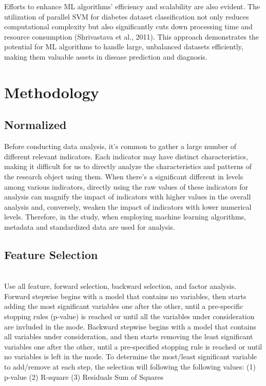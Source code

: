 \documentclass[11pt]{article}
\begin{document}
Efforts to enhance ML algorithms' efficiency and scalability are also evident. The utilization of parallel SVM for diabetes dataset classification not only reduces computational complexity but also significantly cuts down processing time and resource consumption (Shrivastava et al., 2011). This approach demonstrates the potential for ML algorithms to handle large, unbalanced datasets efficiently, making them valuable assets in disease prediction and diagnosis.

\section{Methodology}
\subsection{Normalized}
\text 
Before conducting data analysis, it's common to gather a large number of different relevant indicators. Each indicator may have distinct characteristics, making it difficult for us to directly analyze the characteristics and patterns of the research object using them. When there's a significant different in levels among various indicators, directly using the raw values of these indicators for analysis can magnify the impact of indicators with higher values in the overall analysis and, conversely, weaken the impact of indicators with lower numerical levels. Therefore, in the study, when employing machine learning algorithms, metadata and standardized data are used for analysis. 
\subsection{Feature Selection}\\
\text Use all feature, forward selection, backward selection, and factor analysis. Forward stepwise begins with a model that contains no variables, then starts adding the most significant variables one after the other, until a pre-specific stopping rules (p-value) is reached or until all the variables under consideration are invluded in the mode. Backward stepwise begins with a model that contains all variables under consideration, and then starts removing the least significant variables one after the other, until a pre-specified stopping rule is reached or until no variables is left in the mode. To determine the most/least significant variable to add/remove at each step, the selection will following the following values: (1) p-value (2) R-square (3) Residuals Sum of Squares
\end{document}

